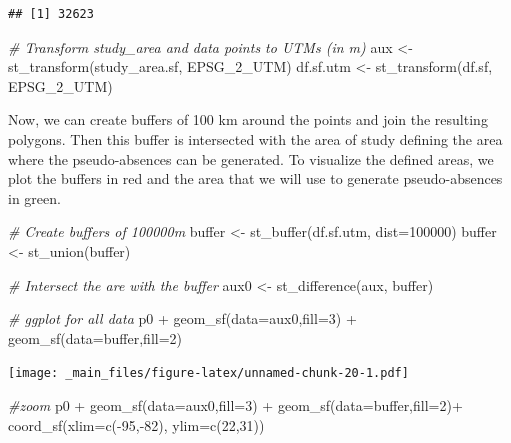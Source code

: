 \documentclass[
]{book}
\newenvironment{Shaded}{\begin{snugshade}}{\end{snugshade}}
\newcommand{\AttributeTok}[1]{\textcolor[rgb]{0.77,0.63,0.00}{#1}}
\newcommand{\CommentTok}[1]{\textcolor[rgb]{0.56,0.35,0.01}{\textit{#1}}}
\newcommand{\DecValTok}[1]{\textcolor[rgb]{0.00,0.00,0.81}{#1}}
\newcommand{\FunctionTok}[1]{\textcolor[rgb]{0.00,0.00,0.00}{#1}}
\newcommand{\NormalTok}[1]{#1}
\newcommand{\OtherTok}[1]{\textcolor[rgb]{0.56,0.35,0.01}{#1}}
\newcommand{\SpecialCharTok}[1]{\textcolor[rgb]{0.00,0.00,0.00}{#1}}
\begin{document}
\begin{verbatim}
## [1] 32623
\end{verbatim}

\begin{Shaded}
\begin{Highlighting}[]
\CommentTok{\# Transform study\_area and data points to UTMs (in m)}
\NormalTok{aux }\OtherTok{\textless{}{-}} \FunctionTok{st\_transform}\NormalTok{(study\_area.sf, EPSG\_2\_UTM)}
\NormalTok{df.sf.utm }\OtherTok{\textless{}{-}} \FunctionTok{st\_transform}\NormalTok{(df.sf, EPSG\_2\_UTM)}
\end{Highlighting}
\end{Shaded}

Now, we can create buffers of 100 km around the points and join the resulting polygons. Then this buffer is intersected with the area of study defining the area where the pseudo-absences can be generated. To visualize the defined areas, we plot the buffers in red and the area that we will use to generate pseudo-absences in green.

\begin{Shaded}
\begin{Highlighting}[]
\CommentTok{\# Create buffers of 100000m}
\NormalTok{buffer }\OtherTok{\textless{}{-}} \FunctionTok{st\_buffer}\NormalTok{(df.sf.utm, }\AttributeTok{dist=}\DecValTok{100000}\NormalTok{)}
\NormalTok{buffer }\OtherTok{\textless{}{-}} \FunctionTok{st\_union}\NormalTok{(buffer)}

\CommentTok{\# Intersect the are with the buffer}
\NormalTok{aux0 }\OtherTok{\textless{}{-}} \FunctionTok{st\_difference}\NormalTok{(aux, buffer)}

\CommentTok{\# ggplot for all data}
\NormalTok{p0 }\SpecialCharTok{+}
  \FunctionTok{geom\_sf}\NormalTok{(}\AttributeTok{data=}\NormalTok{aux0,}\AttributeTok{fill=}\DecValTok{3}\NormalTok{) }\SpecialCharTok{+}
  \FunctionTok{geom\_sf}\NormalTok{(}\AttributeTok{data=}\NormalTok{buffer,}\AttributeTok{fill=}\DecValTok{2}\NormalTok{)}
\end{Highlighting}
\end{Shaded}

\texttt{[image: \_main\_files/figure-latex/unnamed-chunk-20-1.pdf]}

\begin{Shaded}
\begin{Highlighting}[]
\CommentTok{\#zoom}
\NormalTok{p0 }\SpecialCharTok{+}
  \FunctionTok{geom\_sf}\NormalTok{(}\AttributeTok{data=}\NormalTok{aux0,}\AttributeTok{fill=}\DecValTok{3}\NormalTok{) }\SpecialCharTok{+}
  \FunctionTok{geom\_sf}\NormalTok{(}\AttributeTok{data=}\NormalTok{buffer,}\AttributeTok{fill=}\DecValTok{2}\NormalTok{)}\SpecialCharTok{+}
  \FunctionTok{coord\_sf}\NormalTok{(}\AttributeTok{xlim=}\FunctionTok{c}\NormalTok{(}\SpecialCharTok{{-}}\DecValTok{95}\NormalTok{,}\SpecialCharTok{{-}}\DecValTok{82}\NormalTok{), }\AttributeTok{ylim=}\FunctionTok{c}\NormalTok{(}\DecValTok{22}\NormalTok{,}\DecValTok{31}\NormalTok{))}
\end{Highlighting}
\end{Shaded}
\end{document}

